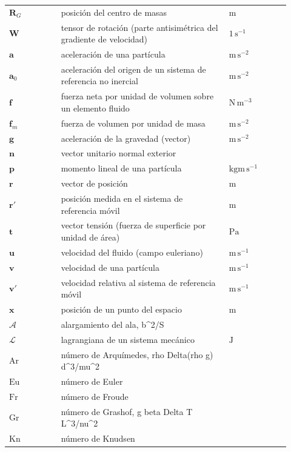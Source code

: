 \documentclass[10pt,openany]{book}
\begin{document}
\begin{longtable}{@{}>{\centering\arraybackslash}p{0.17\linewidth}>{\raggedright\arraybackslash}p{0.55\linewidth}>{\raggedright\arraybackslash}p{0.2\linewidth}@{}}
$\mathbf{R}_G$ & posición del centro de masas & $\mathrm{m}$ \\
$\mathbf{W}$ & tensor de rotación (parte antisimétrica del gradiente de velocidad) & $\mathrm{1\,s^{-1}}$ \\
$\mathbf{a}$ & aceleración de una partícula & $\mathrm{m\,s^{-2}}$ \\
$\mathbf{a}_0$ & aceleración del origen de un sistema de referencia no inercial & $\mathrm{m\,s^{-2}}$ \\
$\mathbf{f}$ & fuerza neta por unidad de volumen sobre un elemento fluido & $\mathrm{N\,m^{-3}}$ \\
$\mathbf{f}_m$ & fuerza de volumen por unidad de masa & $\mathrm{m\,s^{-2}}$ \\
$\mathbf{g}$ & aceleración de la gravedad (vector) & $\mathrm{m\,s^{-2}}$ \\
$\mathbf{n}$ & vector unitario normal exterior &  \\
$\mathbf{p}$ & momento lineal de una partícula & $\mathrm{kg m\,s^{-1}}$ \\
$\mathbf{r}$ & vector de posición & $\mathrm{m}$ \\
$\mathbf{r}'$ & posición medida en el sistema de referencia móvil & $\mathrm{m}$ \\
$\mathbf{t}$ & vector tensión (fuerza de superficie por unidad de área) & $\mathrm{Pa}$ \\
$\mathbf{u}$ & velocidad del fluido (campo euleriano) & $\mathrm{m\,s^{-1}}$ \\
$\mathbf{v}$ & velocidad de una partícula & $\mathrm{m\,s^{-1}}$ \\
$\mathbf{v}'$ & velocidad relativa al sistema de referencia móvil & $\mathrm{m\,s^{-1}}$ \\
$\mathbf{x}$ & posición de un punto del espacio & $\mathrm{m}$ \\
$\mathcal{A}$ & alargamiento del ala, b\textasciicircum{}2/S &  \\
$\mathcal{L}$ & lagrangiana de un sistema mecánico & $\mathrm{J}$ \\
$\mathrm{Ar}$ & número de Arquímedes, rho Delta(rho g) d\textasciicircum{}3/mu\textasciicircum{}2 &  \\
$\mathrm{Eu}$ & número de Euler &  \\
$\mathrm{Fr}$ & número de Froude &  \\
$\mathrm{Gr}$ & número de Grashof, g beta Delta T L\textasciicircum{}3/nu\textasciicircum{}2 &  \\
$\mathrm{Kn}$ & número de Knudsen &  \\

\end{longtable}
\end{document}
